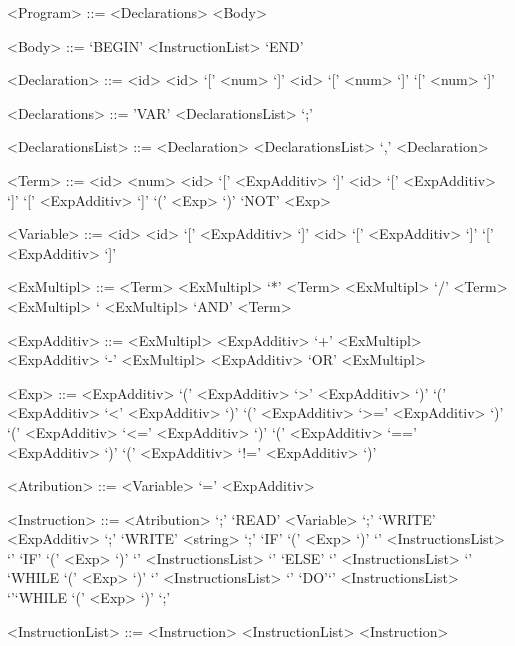 \documentclass{article}
\begin{document}
\begin{grammar}

<Program> ::= <Declarations> <Body> 

<Body> ::= `BEGIN' <InstructionList> `END'

<Declaration> ::= <id>
\alt <id> `[' <num> `]'
\alt <id> `[' <num> `]' `[' <num> `]' 

<Declarations> ::= 'VAR' <DeclarationsList> `;' 

<DeclarationsList> ::= <Declaration> 
\alt <DeclarationsList> `,' <Declaration> 

<Term> ::= <id>
\alt <num>
\alt <id> `[' <ExpAdditiv> `]'
\alt <id> `[' <ExpAdditiv> `]' `[' <ExpAdditiv> `]'
\alt `(' <Exp> `)'
\alt `NOT' <Exp>

<Variable> ::= <id>
\alt <id> `[' <ExpAdditiv> `]'
\alt <id> `[' <ExpAdditiv> `]' `[' <ExpAdditiv> `]' 
 
<ExMultipl> ::= <Term>
\alt <ExMultipl> `*'  <Term>
\alt <ExMultipl> `/' <Term>
\alt <ExMultipl> `%
\alt <ExMultipl> `AND' <Term>

<ExpAdditiv> ::= <ExMultipl> 
\alt <ExpAdditiv> `+' <ExMultipl>
\alt <ExpAdditiv> `-' <ExMultipl> 
\alt <ExpAdditiv> `OR' <ExMultipl> 


<Exp> ::= <ExpAdditiv>             
\alt `(' <ExpAdditiv> `>'  <ExpAdditiv> `)'
\alt `(' <ExpAdditiv> `<'  <ExpAdditiv> `)'
\alt `(' <ExpAdditiv> `>=' <ExpAdditiv> `)'
\alt `(' <ExpAdditiv> `<=' <ExpAdditiv> `)'
\alt `(' <ExpAdditiv> `==' <ExpAdditiv> `)'
\alt `(' <ExpAdditiv> `!=' <ExpAdditiv> `)'



<Atribution> ::=  <Variable> `=' <ExpAdditiv> 

<Instruction> ::= <Atribution> `;' 
\alt `READ'  <Variable> `;'
\alt `WRITE' <ExpAdditiv> `;'                      
\alt `WRITE' <string> `;'
\alt `IF' `(' <Exp> `)' `{' <InstructionsList> `}' 
\alt `IF' `(' <Exp> `)' `{' <InstructionsList> `}' `ELSE' `{' <InstructionsList> `}' 
\alt `WHILE `(' <Exp> `)' `{' <InstructionsList> `}' 
\alt `DO'`{' <InstructionsList> `}'`WHILE `(' <Exp> `)' `;' 

<InstructionList> ::= <Instruction>
\alt <InstructionList> <Instruction>  

\end{grammar}
\end{document}
